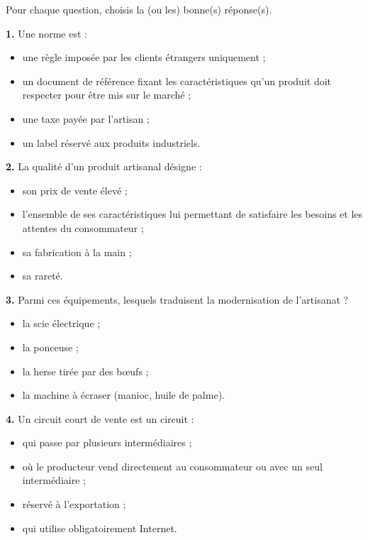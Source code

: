 \documentclass[11pt]{article}
\newcommand{\cle}[1]{{\popxbold\color{popdark}#1}}
\begin{document}
\begin{exercice}
Pour chaque question, choisis la (ou les) bonne(s) réponse(s).

\textbf{1.} Une \cle{norme} est :
\begin{itemize}
\item[a)] une règle imposée par les clients étrangers uniquement ;
\item[b)] un document de référence fixant les caractéristiques qu'un produit doit respecter pour être mis sur le marché ;
\item[c)] une taxe payée par l'artisan ;
\item[d)] un label réservé aux produits industriels.
\end{itemize}

\textbf{2.} La \cle{qualité} d'un produit artisanal désigne :
\begin{itemize}
\item[a)] son prix de vente élevé ;
\item[b)] l'ensemble de ses caractéristiques lui permettant de satisfaire les besoins et les attentes du consommateur ;
\item[c)] sa fabrication à la main ;
\item[d)] sa rareté.
\end{itemize}

\textbf{3.} Parmi ces équipements, lesquels traduisent la modernisation de l'artisanat ?
\begin{itemize}
\item[a)] la scie électrique ;
\item[b)] la ponceuse ;
\item[c)] la herse tirée par des bœufs ;
\item[d)] la machine à écraser (manioc, huile de palme).
\end{itemize}

\textbf{4.} Un \cle{circuit court} de vente est un circuit :
\begin{itemize}
\item[a)] qui passe par plusieurs intermédiaires ;
\item[b)] où le producteur vend directement au consommateur ou avec un seul intermédiaire ;
\item[c)] réservé à l'exportation ;
\item[d)] qui utilise obligatoirement Internet.
\end{itemize}
\end{exercice}
\end{document}
